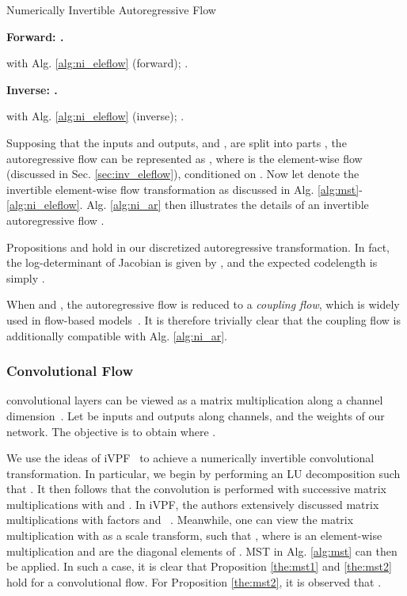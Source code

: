 \documentclass{article}
\begin{document}
\begin{algorithm}[h]
\small
\caption{Numerically Invertible Autoregressive Flow}
\begin{multicols}{2} 
\textbf{Forward: .} 

\begin{algorithmic}[1]
\FOR {}
\STATE  with Alg. \ref{alg:ni_eleflow} (forward);
\ENDFOR
\RETURN .
\end{algorithmic}

\textbf{Inverse: .} 

\begin{algorithmic}[1]
\FOR {}
\STATE  with Alg. \ref{alg:ni_eleflow} (inverse);
\ENDFOR
\RETURN .
\end{algorithmic}
\end{multicols}
\vspace{-8pt}
\label{alg:ni_ar}
\end{algorithm}

Supposing that the inputs and outputs,  and , are split into  parts , the autoregressive flow  can be represented as , where  is the element-wise flow (discussed in Sec. \ref{sec:inv_eleflow}), conditioned on . Now let  denote the invertible element-wise flow transformation as discussed in Alg. \ref{alg:mst}-\ref{alg:ni_eleflow}. Alg. \ref{alg:ni_ar} then illustrates the details of an invertible autoregressive flow .

Propositions  and  hold in our discretized autoregressive transformation. In fact, the log-determinant of Jacobian is given by , and the expected codelength is simply .

When  and , the autoregressive flow is reduced to a \textit{coupling flow}, which is widely used in flow-based models~\cite{dinh2014nice,dinh2016density,ho2019flow++}. It is therefore trivially clear that the coupling flow is additionally compatible with Alg. \ref{alg:ni_ar}.

\subsubsection{ Convolutional Flow}

 convolutional layers can be viewed as a matrix multiplication along a channel dimension~\cite{kingma2018glow}. Let  be inputs and outputs along channels, and  the weights of our network. The objective is to obtain  where .

We use the ideas of iVPF~\cite{zhang2021ivpf} to achieve a numerically invertible  convolutional transformation. In particular, we begin by performing an LU decomposition such that . It then follows that the  convolution is performed with successive matrix multiplications with  and . In iVPF, the authors extensively discussed matrix multiplications with factors  and ~\cite{zhang2021ivpf}. Meanwhile, one can view the matrix multiplication with  as a scale transform, such that , where  is an element-wise multiplication and  are the diagonal elements of . MST in Alg. \ref{alg:mst} can then be applied. In such a case, it is clear that Proposition \ref{the:mst1} and \ref{the:mst2} hold for a  convolutional flow. For Proposition \ref{the:mst2}, it is observed that .
\end{document}
